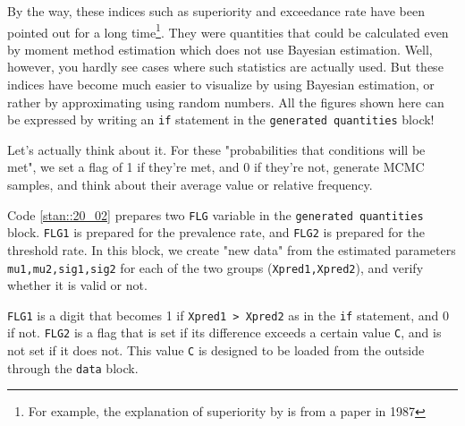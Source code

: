 \documentclass{ltjsbook}
\begin{document}
By the way, these indices such as superiority and exceedance rate have been pointed out for a long time\footnote{For example, the explanation of superiority by \textcite{Haebara1987} is from a paper in 1987}. They were quantities that could be calculated even by moment method estimation which does not use Bayesian estimation. Well, however, you hardly see cases where such statistics are actually used. But these indices have become much easier to visualize by using Bayesian estimation, or rather by approximating using random numbers. All the figures shown here can be expressed by writing an \verb|if| statement in the \verb|generated quantities| block!

Let's actually think about it. For these "probabilities that conditions will be met", we set a flag of 1 if they're met, and 0 if they're not, generate MCMC samples, and think about their average value or relative frequency.


Code \ref{stan::20_02} prepares two \verb|FLG| variable in the \verb|generated quantities| block. \verb|FLG1| is prepared for the prevalence rate, and \verb|FLG2| is prepared for the threshold rate.
In this block, we create "new data" from the estimated parameters \verb|mu1,mu2,sig1,sig2| for each of the two groups (\verb|Xpred1,Xpred2|), and verify whether it is valid or not.

\verb|FLG1| is a digit that becomes 1 if \verb|Xpred1 > Xpred2| as in the \verb|if| statement, and 0 if not.
\verb|FLG2| is a flag that is set if its difference exceeds a certain value \verb|C|, and is not set if it does not. This value \verb|C| is designed to be loaded from the outside through the \verb|data| block.
\end{document}
